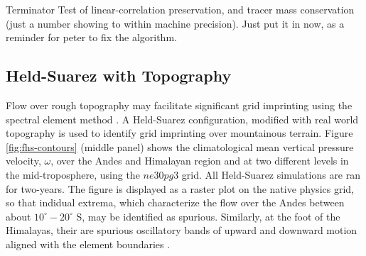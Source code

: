 \documentclass{agujournal}
\begin{document}
{\color{red}Terminator Test of linear-correlation preservation, and tracer mass conservation (just a number showing to within machine precision). Just put it in now, as a reminder for peter to fix the algorithm.}

\subsection{Held-Suarez with Topography}

Flow over rough topography may facilitate significant grid imprinting using the spectral element method \citep{gmdd-8-4623-2015,HL2018MWR}. A Held-Suarez configuration, modified with real world topography is used to identify grid imprinting over mountainous terrain. Figure \ref{fig:fhs-contours} (middle panel) shows the climatological mean vertical pressure velocity, $\omega$, over the Andes and Himalayan region and at two different levels in the mid-troposphere, using the $ne30pg3$ grid. All Held-Suarez simulations are ran for two-years. The figure is displayed as a raster plot on the native physics grid, so that indidual extrema, which characterize the flow over the Andes between about $10^\circ-20^\circ$ S, may be identified as spurious. Similarly, at the foot of the Himalayas, their are spurious oscillatory bands of upward and downward motion aligned with the element boundaries \citep[see also ][]{HL2018MWR}. 
\end{document}

